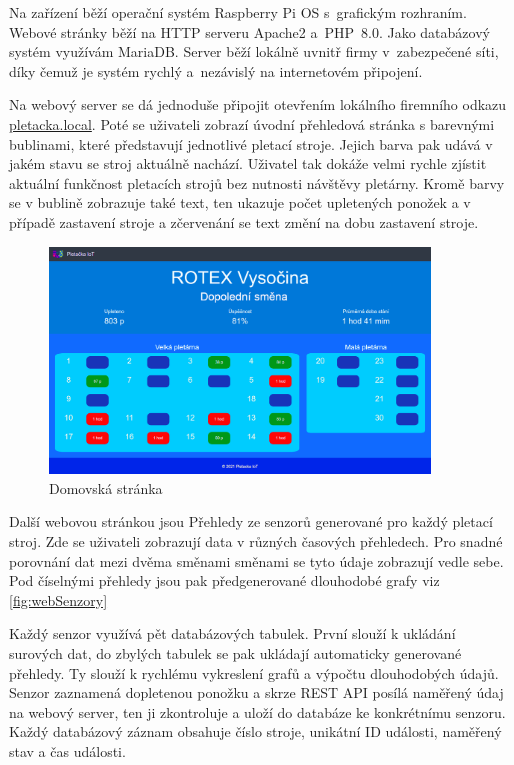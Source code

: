 \documentclass[12pt, a4paper]{article}
\begin{document}
Na zařízení běží operační systém Raspberry Pi OS s~grafickým rozhraním.
Webové stránky běží na HTTP serveru Apache2 a~PHP~8.0.
Jako databázový systém využívám MariaDB.
Server běží lokálně uvnitř firmy v~zabezpečené síti, díky čemuž je systém rychlý a~nezávislý na internetovém připojení.

Na webový server se dá jednoduše připojit otevřením lokálního firemního odkazu \href{http://pletacka.local}{pletacka.local}.
Poté se uživateli zobrazí úvodní přehledová stránka s barevnými bublinami, které představují jednotlivé pletací stroje.
Jejich barva pak udává v jakém stavu se stroj aktuálně nachází. Uživatel tak dokáže velmi rychle zjístit aktuální funkčnost pletacích strojů bez nutnosti návštěvy pletárny.
Kromě barvy se v bublině zobrazuje také text, ten ukazuje počet upletených ponožek a v případě zastavení stroje a zčervenání se text změní na dobu zastavení stroje.

\begin{figure}[t]
    \centering
    \includegraphics[width=0.9\textwidth]{img/Uvod.png}
    \caption{Domovská stránka}
    \label{fig:webUvod}
\end{figure}

Další webovou stránkou jsou Přehledy ze senzorů generované pro každý pletací stroj.
Zde se uživateli zobrazují data v různých časových přehledech.
Pro snadné porovnání dat mezi dvěma směnami směnami se tyto údaje zobrazují vedle sebe.
Pod číselnými přehledy jsou pak předgenerované dlouhodobé grafy viz \ref{fig:webSenzory}

Každý senzor využívá pět databázových tabulek. První slouží k ukládání surových dat, do zbylých tabulek se pak ukládají automaticky generované přehledy.
Ty slouží k rychlému vykreslení grafů a výpočtu dlouhodobých údajů.
Senzor zaznamená dopletenou ponožku a skrze REST API posílá naměřený údaj na webový server, ten ji zkontroluje a uloží do databáze ke konkrétnímu senzoru.
Každý databázový záznam obsahuje číslo stroje, unikátní ID události, naměřený stav a čas události.
\end{document}
